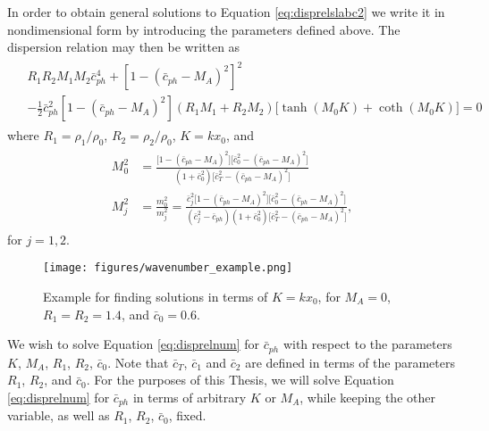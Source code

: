 In order to obtain general solutions to Equation \eqref{eq:disprelslabc2} we write it in nondimensional form by introducing the parameters defined above.
The dispersion relation may then be written as
%
\begin{align}
\label{eq:disprelnum}
\begin{split}
& R_1 R_2 M_1 M_2 \bar c_{ph}^4
+ \left[ 1 - ( \bar c_{ph} - M_A )^2 \right]^2
\\[0.3cm]
& - \frac{1}{2} \bar c_{ph}^2 \left[ 1 - ( \bar c_{ph} - M_A )^2 \right]
\left( R_1 M_1 + R_2 M_2 \right)
\big[ \tanh ( M_0 K ) + \coth ( M_0 K ) \big] = 0
\end{split}
\end{align}
%
where $R_1 = \rho_1/\rho_0$, $R_2 = \rho_2/\rho_0$, $K = k x_0$, and
%
\begin{align}
\label{eq:Mj}
\begin{split}
M_0^2
& = \frac{\big[1 - ( \bar c_{ph} - M_A )^2 \big] \big[\bar c_0^2 - ( \bar c_{ph} - M_A )^2 \big] }
{ (1 + \bar c_0^2) \big[\bar c_T^2 - ( \bar c_{ph} - M_A )^2 \big] }
\\[0.3cm]
M_j^2 & = \frac{m_0^2}{m_j^2}
= \frac{\bar c_j^2 \big[1 - ( \bar c_{ph} - M_A )^2 \big] \big[\bar c_0^2 - ( \bar c_{ph} - M_A )^2 \big] }
{(\bar c_j^2 - \bar c_{ph} ) (1 + \bar c_0^2) \big[\bar c_T^2 - ( \bar c_{ph} - M_A )^2 \big] },
\end{split}
\end{align}
%
for $j = 1, 2$.

%
\begin{figure}[ht]
\centering
 \texttt{[image: figures/wavenumber\_example.png]}
 \caption{Example for finding solutions in terms of $K = k x_0$, for $M_A=0$, $R_1=R_2=1.4$, and $\bar c_0 = 0.6$.}
 \label{fig:num_example}
\end{figure}
%

We wish to solve Equation \eqref{eq:disprelnum} for $\bar c_{ph}$ with respect to the parameters $K$, $M_A$, $R_1$, $R_2$, $\bar c_0$.
Note that $\bar c_T$, $\bar c_1$ and $\bar c_2$ are defined in terms of the parameters $R_1$, $R_2$, and $\bar c_0$.
For the purposes of this Thesis, we will solve Equation \eqref{eq:disprelnum} for $\bar c_{ph}$ in terms of arbitrary $K$ or $M_A$, while keeping the other variable, as well as $R_1$, $R_2$, $\bar c_0$, fixed.


